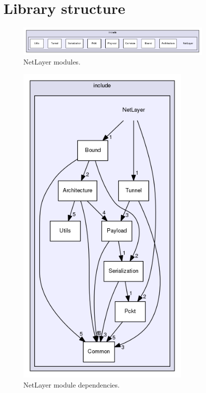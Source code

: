 \documentclass[12pt]{report}
\newcommand{\+}{\discretionary{\mbox{\scriptsize$\hookleftarrow$}}{}{}}
\begin{document}
%
%

\chapter{Library structure}

\begin{figure}[!htb]
\caption{NetLayer modules.}
\centering
\includegraphics[width=0.85\textwidth]{inc/0.png}
\end{figure}

\begin{figure}[!htb]
\caption{NetLayer module dependencies.}
\centering
\includegraphics[width=0.75\textwidth]{inc/deps.png}
\end{figure}
\end{document}
